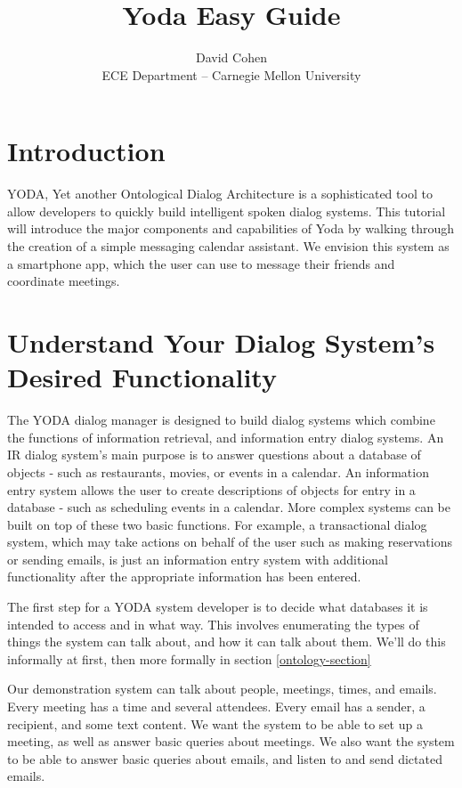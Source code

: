 \documentclass[10pt]{article}
\begin{document}
\title{Yoda Easy Guide}
\author{David Cohen\\
ECE Department -- Carnegie Mellon University}
\date{}
\maketitle

\section{Introduction}

\noindent YODA, Yet another Ontological Dialog Architecture is a sophisticated tool to allow developers to quickly build intelligent spoken dialog systems.
This tutorial will introduce the major components and capabilities of Yoda by walking through the creation of a simple messaging calendar assistant.
We envision this system as a smartphone app, which the user can use to message their friends and coordinate meetings.


\section {Understand Your Dialog System's Desired Functionality}
The YODA dialog manager is designed to build dialog systems which combine the functions of information retrieval, and information entry dialog systems.
An IR dialog system's main purpose is to answer questions about a database of objects - such as restaurants, movies, or events in a calendar.
An information entry system allows the user to create descriptions of objects for entry in a database - such as scheduling events in a calendar.
More complex systems can be built on top of these two basic functions.
For example, a transactional dialog system, which may take actions on behalf of the user such as making reservations or sending emails, is just an information entry system with additional functionality after the appropriate information has been entered.

The first step for a YODA system developer is to decide what databases it is intended to access and in what way.
This involves enumerating the types of things the system can talk about, and how it can talk about them.
We'll do this informally at first, then more formally in section \ref{ontology-section}

Our demonstration system can talk about people, meetings, times, and emails.
Every meeting has a time and several attendees.
Every email has a sender, a recipient, and some text content.
We want the system to be able to set up a meeting, as well as answer basic queries about meetings.
We also want the system to be able to answer basic queries about emails, and listen to and send dictated emails.
\end{document}
